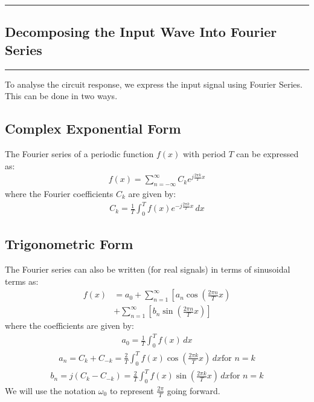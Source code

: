 \newpage
\begin{multicols}{2}
\tableofcontents
\end{multicols}
\newpage

{\color{gray}\hrule}
\begin{center}
\section{Decomposing the Input Wave Into Fourier Series}
\bigskip
\end{center}
{\color{gray}\hrule}
\begin{multicols}{2}

To analyse the circuit response, we express the input signal using Fourier Series. This can be done in two ways.

\subsection{Complex Exponential Form}
The Fourier series of a periodic function \( f(x) \) with period \( T \) can be expressed as:
\begin{align}
f(x) = \sum_{n=-\infty}^{\infty} C_k e^{j \frac{2\pi k}{T} x}  
\end{align}
where the Fourier coefficients \( C_k \) are given by:
\begin{align}
C_k = \frac{1}{T} \int_{0}^{T} f(x) e^{-j \frac{2\pi k}{T} x} \, dx \label{1}
\end{align}

\subsection{Trigonometric Form}
The Fourier series can also be written (for real signals) in terms of sinusoidal terms as:
\begin{equation}
\begin{split}
f(x) &= a_0 + \sum_{n=1}^{\infty} \left[ a_n \cos\left(\frac{2\pi n}{T} x \right) \right. \\
&+ \sum_{n=1}^{\infty} \left[ b_n \sin\left(\frac{2\pi n}{T} x \right) \right]
\end{split}
\end{equation}
where the coefficients are given by:
\begin{align}
a_0 = \frac{1}{T} \int_{0}^{T} f(x) \, dx \label{2}
\end{align}
\begin{align}
	a_n =C_k+C_{-k} = \frac{2}{T} \int_{0}^{T} f(x) \cos\left(\frac{2\pi k}{T} x \right) \, dx \label{3} \text{for $n=k$}
\end{align}
\begin{align}
	b_n = j(C_k-C_{-k}) =\frac{2}{T} \int_{0}^{T} f(x) \sin\left(\frac{2\pi k}{T} x \right) \, dx \label{4} \text{for $n=k$}
\end{align}
We will use the notation $\omega_0$ to represent $\frac{2\pi}{T}$ going forward.


\end{multicols}
